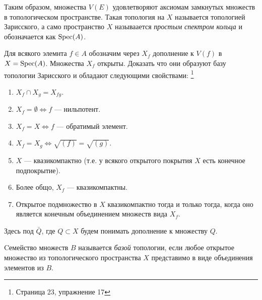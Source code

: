     Таким образом, множества $V(E)$ удовлетворяют аксиомам замкнутых множеств в топологическом пространстве. Такая топология на $X$ называется топологией Зарисского,
    а само пространство $X$ называается \textit{простым спектром кольца} и обозначается как $\textup{Spec}(A)$.

    \begin{Ex}
        Для всякого элемнта $f \in A$ обозначим через $X_f$ дополнение к $V(f)$ в $X = \textup{Spec}(A)$. Множества $X_f$ открыты. Доказать что они образуют базу топологии Зарисского и обладают
        следующими свойствами: \footnote{\cite{A-M} Страница 23, упражнение 17}
        \begin{enumerate}
            \item $X_f \cap X_g = X_{fg}$.
            \item $X_f = \emptyset \Leftrightarrow f$ --- нильпотент.
            \item $X_f = X \Leftrightarrow f$ --- обратимый элемент.
            \item $X_f = X_g \Leftrightarrow \sqrt{(f)} = \sqrt{(g)}$.
            \item $X$ --- квазикомпактно (т.е. у всякого открытого покрытия $X$ есть конечное подпокрытие).
            \item Более общо, $X_f$ --- квазикомпактны.
            \item Открытое подмножество в $X$ квазикомпактно тогда и только тогда, когда оно является конечным объединением множеств вида $X_f$.
        \end{enumerate}
    \end{Ex}
    Здесь под $\bar Q$, где $Q \subset X$ будем понимать дополнение к множеству $Q$.

    \begin{Def}
        Cемейство множеств $B$ называется \textit{базой} топологии, если любое открытое множество из топологического пространства $X$ представимо в виде объединения элементов из $B$.
    \end{Def}

